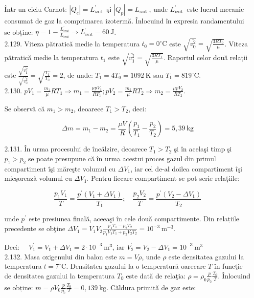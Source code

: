 Într-un ciclu Carnot: $\left|Q_{c}\right|=L_{\text {izot }}^{\prime}$ şi $\left|Q_{p}\right|=L_{\text {izot }}$, unde $L_{\text {izot }}^{\prime}$ este lucrul mecanic consumat de gaz la comprimarea izotermă. Înlocuind în expresia randamentului se obține: $\eta=1-\frac{L_{\mathrm{izot}}^{\prime}}{L_{\mathrm{izot}}} \Rightarrow L_{\mathrm{izot}}^{\prime}=60 \mathrm{~J}$.\\
2.129. Viteza pătratică medie la temperatura $t_{0}=0^{\circ} \mathrm{C}$ este $\sqrt{\overline{v_{0}^{2}}}=\sqrt{\frac{3 R T_{0}}{\mu}}$. Viteza pătratică medie la temperatura $t_{1}$ este $\sqrt{\overline{v_{1}^{2}}}=\sqrt{\frac{3 R T_{1}}{\mu}}$. Raportul celor două relații este $\frac{\sqrt{\overline{v_{1}^{2}}}}{\sqrt{\overline{v_{0}^{2}}}}=\sqrt{\frac{T_{1}}{T_{0}}}=2$, de unde: $T_{1}=4 T_{0}=1092 \mathrm{~K}$ sau $T_{1}=819^{\circ} \mathrm{C}$.\\
2.130. $p V_{1}=\frac{m_{1}}{\mu} R T_{1} \Rightarrow m_{1}=\frac{\mu p V_{1}}{R T_{1}} ; p V_{2}=\frac{m_{2}}{\mu} R T_{2} \Rightarrow m_{2}=\frac{\mu p V_{2}}{R T_{2}}$.

Se observă că $m_{1}>m_{2}$, deoarece $T_{1}>T_{2}$, deci:

$$
\Delta m=m_{1}-m_{2}=\frac{\mu V}{R}\left(\frac{p_{1}}{T_{1}}-\frac{p_{2}}{T_{2}}\right)=5,39 \mathrm{~kg}
$$

2.131. În urma procesului de încălzire, deoarece $T_{1}>T_{2}$ şi în acelaşi timp şi $p_{1}>p_{2}$ se poate presupune că în urma acestui proces gazul din primul compartiment îşi măreşte volumul cu $\Delta V_{1}$, iar cel de-al doilea compartiment îşi micşorează volumul cu $\Delta V_{1}$. Pentru fiecare compartiment se pot scrie relațiile:

$$
\frac{p_{1} V_{1}}{T}=\frac{p^{\prime}\left(V_{1}+\Delta V_{1}\right)}{T_{1}} ; \quad \frac{p_{2} V_{2}}{T}=\frac{p^{\prime}\left(V_{2}-\Delta V_{1}\right)}{T_{2}}
$$

unde $p^{\prime}$ este presiunea finală, aceeaşi în cele două compartimente. Din relațiile precedente se obţine $\Delta V_{1}=V_{1} V_{2} \frac{p_{1} T_{1}-p_{2} T_{2}}{p_{1} V_{1} T_{1}+p_{2} V_{2} T_{2}}=10^{-3} \mathrm{~m}^{-3}$.

Deci: $\quad V_{1}^{\prime}=V_{1}+\Delta V_{1}=2 \cdot 10^{-3} \mathrm{~m}^{3}$, iar $V_{2}^{\prime}=V_{2}-\Delta V_{1}=10^{-3} \mathrm{~m}^{3}$\\
2.132. Masa oxigenului din balon este $m=V \rho$, unde $\rho$ este densitatea gazului la temperatura $t=7^{\circ} \mathrm{C}$. Densitatea gazului la o temperatură oarecare $T$ în funcţie de densitatea gazului la temperatura $T_{0}$ este dată de relaţia: $\rho=\rho_{0} \frac{p}{p_{0}} \frac{T_{0}}{T}$. Înlocuind se obține: $m=\rho V_{0} \frac{p}{p_{0}} \frac{T_{0}}{T}=0,139 \mathrm{~kg}$. Căldura primită de gaz este:


